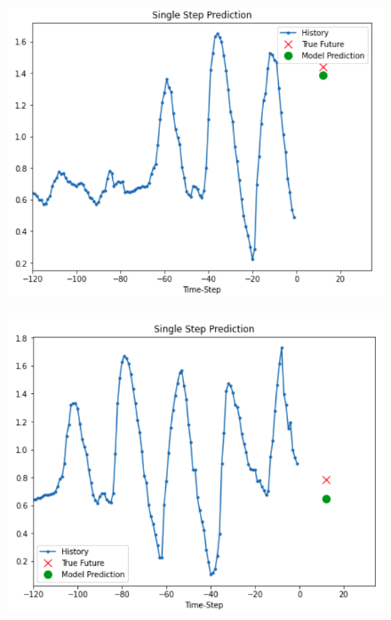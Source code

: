 \vspace{-1cm}
\begin{center}
	\begin{figure}[htp]
		\begin{center}
			\includegraphics[scale=0.45]{./images/9.png}
		\end{center}
	\end{figure}
\end{center}


\vspace{-2cm}
\begin{center}
	\begin{figure}[htp]
		\begin{center}
			\includegraphics[scale=0.45]{./images/10.png}
		\end{center}
	\end{figure}
\end{center}


